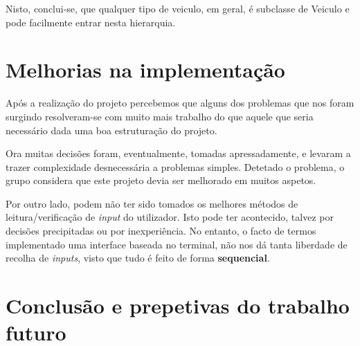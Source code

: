\documentclass[a4paper,11pt]{report}
\begin{document}
\vspace{0.5cm}

Nisto, conclui-se, que qualquer tipo de veiculo, em geral, é subclasse de Veiculo e pode facilmente entrar nesta hierarquia.

\chapter{Melhorias na implementação}

\hspace{0.5cm} Após a realização do projeto percebemos que alguns dos problemas que nos foram surgindo resolveram-se com muito mais trabalho do que aquele que seria necessário dada uma boa estruturação do projeto.
\par \vspace{0.5cm}
Ora muitas decisões foram, eventualmente, tomadas apressadamente, e levaram a trazer complexidade desnecessária a problemas simples. Detetado o problema, o grupo considera que este projeto devia ser melhorado em muitos aspetos.

\par \vspace{0.5cm}
Por outro lado, podem não ter sido tomados os melhores métodos de leitura/verificação de \textit{input} do utilizador. Isto pode ter acontecido, talvez por decisões precipitadas ou por inexperiência. No entanto, o facto de termos implementado uma interface baseada no terminal, não nos dá tanta liberdade de recolha de \textit{inputs}, visto que tudo é feito de forma \textbf{sequencial}.

\chapter{Conclusão e prepetivas do trabalho futuro}
\end{document}
